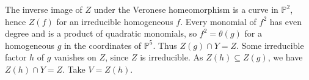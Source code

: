 The inverse image of $Z$ under the Veronese homeomorphism is a curve in $\mathbb P^2$, hence $Z(f)$ for an irreducible homogeneous $f$. Every monomial of $f^2$ has even degree and is a product of quadratic monomials, so $f^2=\theta(g)$ for a homogeneous $g$ in the coordinates of $\mathbb P^5$. Thus $Z(g)\cap Y=Z$. Some irreducible factor $h$ of $g$ vanishes on $Z$, since $Z$ is irreducible. As $Z(h)\subseteq Z(g)$, we have $Z(h)\cap Y=Z$. Take $V=Z(h)$.
